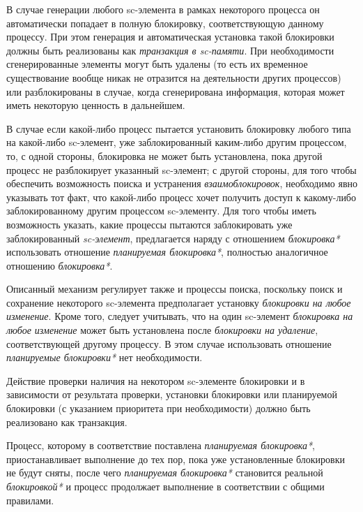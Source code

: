В случае генерации любого sc-элемента в рамках некоторого процесса он автоматически попадает в полную блокировку, соответствующую данному процессу. При этом генерация и автоматическая установка такой блокировки должны быть реализованы как \textit{транзакция в sc-памяти}. При необходимости сгенерированные элементы могут быть удалены (то есть их временное существование вообще никак не отразится на деятельности других процессов) или разблокированы в случае, когда сгенерирована информация, которая может иметь некоторую ценность в дальнейшем.

В случае если какой-либо процесс пытается установить блокировку любого типа на какой-либо sc-элемент, уже заблокированный каким-либо другим процессом, то, с одной стороны, блокировка не может быть установлена, пока другой процесс не разблокирует указанный sc-элемент; с другой стороны, для того чтобы обеспечить возможность поиска и устранения \textit{взаимоблокировок}, необходимо явно указывать тот факт, что какой-либо процесс хочет получить доступ к какому-либо заблокированному другим процессом sc-элементу. Для того чтобы иметь возможность указать, какие процессы пытаются заблокировать уже заблокированный \textit{sc-элемент}, предлагается наряду с отношением \textit{блокировка*} использовать отношение \textit{планируемая блокировка*}, полностью аналогичное отношению \textit{блокировка*}.
	
Описанный механизм регулирует также и процессы поиска, поскольку поиск и сохранение некоторого sc-элемента предполагает установку \textit{блокировки на любое изменение}. Кроме того, следует учитывать, что на один sc-элемент \textit{блокировка на любое изменение} может быть установлена после \textit{блокировки на удаление}, соответствующей другому процессу. В этом случае использовать отношение \textit{планируемые блокировки*} нет необходимости.
	
Действие проверки наличия на некотором sc-элементе блокировки и в зависимости от результата проверки, установки блокировки или планируемой блокировки (с указанием приоритета при необходимости) должно быть реализовано как транзакция.

\begin{SCn}
\end{SCn}

Процесс, которому в соответствие поставлена \textit{планируемая блокировка*}, приостанавливает выполнение до тех пор, пока уже установленные блокировки не будут сняты, после чего \textit{планируемая блокировка*} становится реальной \textit{блокировкой*} и процесс продолжает выполнение в соответствии с общими правилами.

